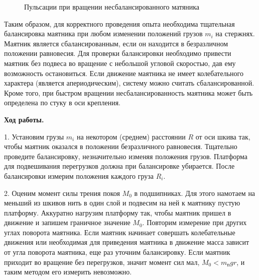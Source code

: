 \documentclass[14pt]{article}
\begin{document}
\begin{figure}[h!]
	\caption{Пульсации при вращении несбалансированного матяника}
	\label{fig:image}
\end{figure} 

Таким образом, для корректного проведения опыта необходима тщательная балансировка маятника при любом изменении положений грузов $m_i$ на стержнях. Маятник является сбалансированным, если он находится в безразличном положении равновесия. Для проверки балансировки необходимо привести маятник без подвеса во вращение с небольшой угловой скоростью, дав ему возможность остановиться. Если движение маятника не имеет колебательного характера (является апериодическим), систему можно считать сбалансированной. Кроме того, при быстром вращении несбалансированность маятника может быть определена по стуку в оси крепления.

\vspace{1cm}
\textbf{Ход работы.}

\vspace{1cm}
1. Установим грузы $m_i$ на некотором (среднем) расстоянии $R$ от оси шкива так, чтобы маятник оказался в положении безразличного равновесия. Тщательно проведите балансировку, незначительно изменяя положения грузов. Платформа для подвешивания перегрузков должна при балансировке убирается. После балансировки измерим положения каждого груза $R_i$.

2. Оценим момент силы трения покоя $M_0$ в подшипниках. Для этого намотаем на меньший из шкивов нить в один слой и подвесим на ней к маятнику пустую платформу. Аккуратно нагрузим платформу так, чтобы маятник пришел в движение и запишем граничное значение $M_0$. Повторим измерение при других углах поворота маятника. Если маятник начинает совершать колебательные движения или необходимая для приведения маятника в движение масса зависит от угла поворота маятника, еще раз уточним балансировку. Если маятник приходит во вращение без перегрузков, значит момент
сил мал, $M_0 < m_\text{п}gr$, и таким методом его измерить невозможно.
\end{document}
